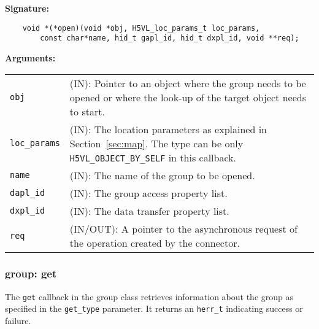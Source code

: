 \begin{mdframed}[style=bgbox]
\textbf{Signature:}
\begin{lstlisting}
    void *(*open)(void *obj, H5VL_loc_params_t loc_params, 
        const char*name, hid_t gapl_id, hid_t dxpl_id, void **req);
\end{lstlisting}

\textbf{Arguments:}\\
\begin{tabular}{l p{13.5cm}}
  \texttt{obj} & (IN): Pointer to an object where the group needs to be
  opened or where the look-up of the target object needs to start.\\
  \texttt{loc\_params} & (IN): The location parameters as explained in
  Section~\ref{sec:map}. The type can be only \texttt{H5VL\_OBJECT\_BY\_SELF} in this callback. \\
  \texttt{name} & (IN): The name of the group to be opened.\\
  \texttt{dapl\_id} & (IN): The group access property list.\\
  \texttt{dxpl\_id} & (IN): The data transfer property list.\\
  \texttt{req} & (IN/OUT): A pointer to the asynchronous request of the
  operation created by the connector.\\
\end{tabular}
\end{mdframed}

\subsubsection{group: get}
The \texttt{get} callback in the group class retrieves information
about the group as specified in the \texttt{get\_type} parameter. It
returns an \texttt{herr\_t} indicating success or failure.\bigskip


